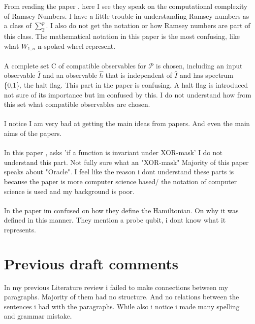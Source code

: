 \documentclass{Assignment}
\begin{document}
From reading the paper \cite{burr1981generalized}, here I see they speak on the computational complexity of Ramsey Numbers. 
I have a little trouble in understanding Ramsey numbers as a class of $\sum_{2}^{p}$. 
I also do not get the notation or how Ramsey numbers are part of this class.
The mathematical notation in this paper is the most confusing, like what $W_{1,n}$ n-spoked wheel represent.
\\
\\
\cite{Deutsch1989}
A complete set C of compatible observables for $\mathcal{P}$ is chosen, including an input 
observable $\hat{I}$ and an observable $\hat{h}$ that is independent of $\hat{I}$ and has spectrum \{0,1\}, the halt flag. 
This part in the paper is confusing.
A halt flag is introduced not sure of its importance but im confused by this.
I do not understand how from this set what compatible observables are chosen.
\\
\\
I notice I am very bad at getting the main ideas from papers.
And even the main aims of the papers.
\\
\\
In this paper \cite{doi:10.1137/S0097539796298637}, asks 'if a function is invariant under XOR-mask' I do not understand this part.
Not fully sure what an "XOR-mask"
Majority of this paper speaks about "Oracle".
I feel like the reason i dont understand these parts is because the paper is more computer science based/ the notation of computer science is used and my background is poor. 
\\\\
In the paper \cite{PhysRevA.93.032301} im confused on how they define the Hamiltonian. 
On why it was defined in this manner.
They mention a probe qubit, i dont know what it represents.
\section*{Previous draft comments}
In my previous Literature review i failed to make connections between my paragraphs.
Majority of them had no structure.
And no relations between the sentences i had with the paragraphs.
While also i notice i made many spelling and grammar mistake.
\newpage

\end{document}
